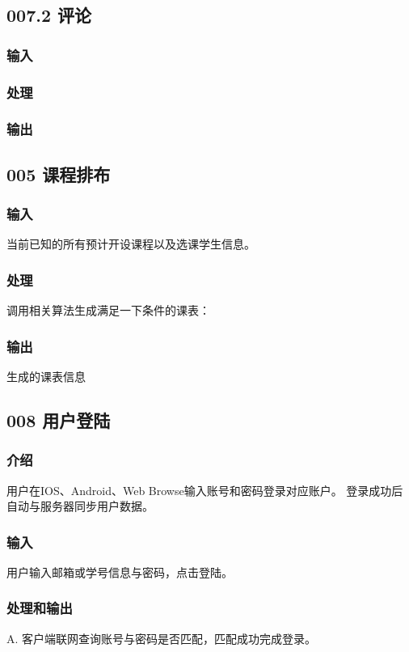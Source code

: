   \subsection{007.2 评论}
    \subsubsection{输入}
    \subsubsection{处理}
    \subsubsection{输出}

  \subsection{005 课程排布}
    \subsubsection{输入}
    当前已知的所有预计开设课程以及选课学生信息。
    \subsubsection{处理}
    调用相关算法生成满足一下条件的课表：
    \subsubsection{输出}
    生成的课表信息

 \subsection{008 用户登陆}
    \subsubsection{介绍}
	用户在IOS、Android、Web Browse输入账号和密码登录对应账户。
登录成功后自动与服务器同步用户数据。
    \subsubsection{输入}
    用户输入邮箱或学号信息与密码，点击登陆。
    \subsubsection{处理和输出}
    A. 客户端联网查询账号与密码是否匹配，匹配成功完成登录。

